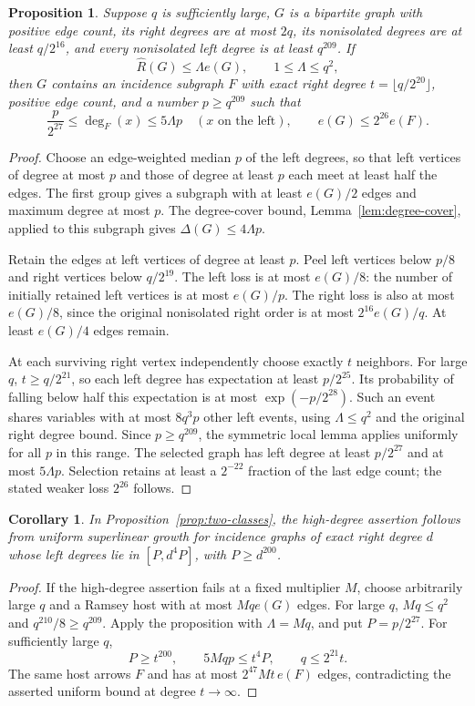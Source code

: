 \documentclass[11pt]{amsart}
\newtheorem{proposition}[theorem]{Proposition}
\newtheorem{corollary}[theorem]{Corollary}
\theoremstyle{definition}
\theoremstyle{remark}
\numberwithin{equation}{section}
\begin{document}
\begin{proposition}\label{prop:semiregular}
Suppose $q $ is sufficiently large, $ G$ is a bipartite graph with positive
edge count, its right degrees are at most $2q$, its nonisolated degrees
are at least $q/2^{16}$, and every nonisolated left degree is at least
$q^{209}$. If
\[
 \widehat R(G)\le \Lambda e(G),\qquad 1\le\Lambda\le q^2,
\]
then $G $ contains an incidence subgraph $ F$ with exact right degree
$t=\lfloor q/2^{20}\rfloor $, positive edge count, and a number $ p\ge q^{209}$
such that
\[
 \frac p{2^{27}}\le\deg_F(x)\le5\Lambda p\quad(x\text{ on the left}),
 \qquad e(G)\le2^{26}e(F).
\]
\end{proposition}
\begin{proof}
Choose an edge-weighted median $p$ of the left degrees, so that left
vertices of degree at most $p $ and those of degree at least $ p$ each
meet at least half the edges. The first group gives a subgraph with at
least $e(G)/2$ edges and maximum degree at most $ p$. The degree-cover
bound, Lemma~\ref{lem:degree-cover}, applied to this subgraph gives
$\Delta(G)\le4\Lambda p$.

Retain the edges at left vertices of degree at least $p$. Peel left
vertices below $p/8$ and right vertices below $ q/2^{19}$. The left loss
is at most $e(G)/8$: the number of initially retained left vertices is
at most $e(G)/p $. The right loss is also at most $ e(G)/8$, since the
original nonisolated right order is at most $2^{16}e(G)/q$. At least
$e(G)/4$ edges remain.

At each surviving right vertex independently choose exactly $t$ neighbors.
For large $q $, $ t\ge q/2^{21}$, so each left degree has expectation at least
$p/2^{25}$. Its probability of falling below half this expectation is
at most $\exp(-p/2^{28})$. Such an event shares variables with at most
$8q^3p $ other left events, using $\Lambda\le q^2$ and the original right
degree bound. Since $p\ge q^{209}$, the symmetric local lemma applies
uniformly for all $p$ in this range. The selected graph has left degree
at least $p/2^{27}$ and at most $5\Lambda p$. Selection retains at least
a $2^{-22}$ fraction of the last edge count; the stated weaker loss
$2^{26}$ follows.
\end{proof}

\begin{corollary}\label{lem:regularization}
In Proposition~\ref{prop:two-classes}, the high-degree assertion follows
from uniform superlinear growth for incidence graphs of exact right
degree $d $ whose left degrees lie in $[P,d^4P]$, with $ P\ge d^{200}$.
\end{corollary}
\begin{proof}
If the high-degree assertion fails at a fixed multiplier $M$, choose
arbitrarily large $q $ and a Ramsey host with at most $ Mq e(G)$ edges.
For large $q $, $ Mq\le q^2$ and $ q^{210}/8\ge q^{209}$.
Apply the proposition with $\Lambda=Mq $, and put $ P=p/2^{27}$.
For sufficiently large $q$,
\[
 P\ge t^{200},\qquad 5Mq p\le t^4P,\qquad q\le2^{21}t.
\]
The same host arrows $F $ and has at most $2^{47}Mt\,e(F)$ edges,
contradicting the asserted uniform bound at degree $t\to\infty$.
\end{proof}
\end{document}
